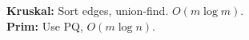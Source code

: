 \textbf{Kruskal:} Sort edges, union-find. $O(m\log m)$. \\[1mm]
\textbf{Prim:} Use PQ, $O(m\log n)$. \\[1mm]
